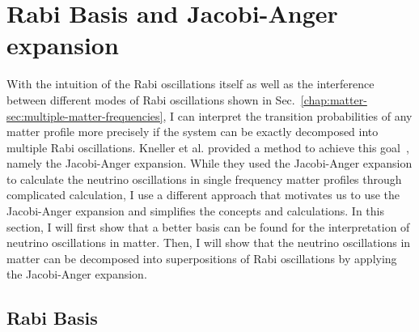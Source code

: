 
\section{\label{sec:jacobi}Rabi Basis and Jacobi-Anger expansion}


With the intuition of the Rabi oscillations itself as well as the interference between different modes of Rabi oscillations shown in Sec.~\ref{chap:matter-sec:multiple-matter-frequencies}, I can interpret the transition probabilities of any matter profile more precisely if the system can be exactly decomposed into multiple Rabi oscillations. Kneller et al. provided a method to achieve this goal~\cite{Kneller2013}, namely the Jacobi-Anger expansion. While they used the Jacobi-Anger expansion to calculate the neutrino oscillations in single frequency matter profiles through complicated calculation, I use a different approach that motivates us to use the Jacobi-Anger expansion and simplifies the concepts and calculations. In this section, I will first show that a better basis can be found for the interpretation of neutrino oscillations in matter. Then, I will show that the neutrino oscillations in matter can be decomposed into superpositions of Rabi oscillations by applying the Jacobi-Anger expansion.


\subsection{\label{chap:matter-sec:jacobi-subsec:rabi-basis}Rabi Basis}


